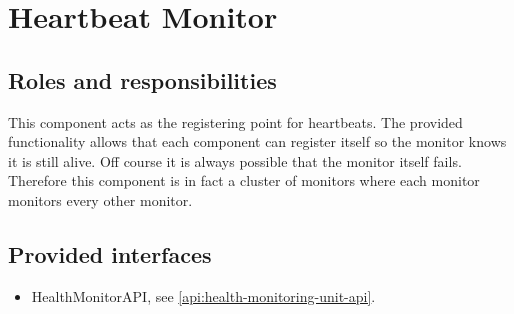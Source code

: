 \section{Heartbeat Monitor}
\label{element:measurements-policy}

\subsection{Roles and responsibilities}

\npar This component acts as the registering point for heartbeats. The provided
functionality allows that each component can register itself so the monitor
knows it is still alive. Off course it is always possible that the monitor
itself fails. Therefore this component is in fact a cluster of monitors where
each monitor monitors every other monitor.

\subsection{Provided interfaces}

\begin{itemize}
  \item HealthMonitorAPI, see \ref{api:health-monitoring-unit-api}.
\end{itemize}



